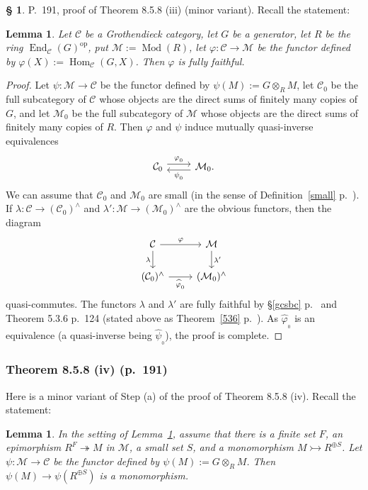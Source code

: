 \documentclass[12pt]{article}
\newtheorem{lem}[thm]{Lemma}
\theoremstyle{remark}
\theoremstyle{definition}
\newtheorem{s}[thm]{\S}
\newcommand{\C}{\mathcal C}
\newcommand{\M}{\mathcal M}
\newcommand{\pp}{\varphi}
\newcommand{\epi}{\twoheadrightarrow}
\DeclareMathOperator{\Hom}{Hom}
\DeclareMathOperator{\Mod}{Mod}
\DeclareMathOperator{\op}{op}
\begin{document}
\begin{s} P.~191, proof of Theorem 8.5.8 (iii) (minor variant). Recall the statement: 

\begin{lem}\label{858iii}
Let $\C$ be a Grothendieck category, let $G$ be a generator, let $R$ be the ring $\operatorname{End}_\C(G)^{\op}$, put $\M:=\Mod(R)$, let $\pp:\C\to\M$ be the functor defined by $\pp(X):=\Hom_\C(G,X)$. Then $\pp$ is fully faithful. 
\end{lem}

\begin{proof}
Let $\psi:\M\to\C$ be the functor defined by $\psi(M):=G\otimes_RM$, let $\C_0$ be the full subcategory of $\C$ whose objects are the direct sums of finitely many copies of $G$, and let $\M_0$ be the full subcategory of $\M$ whose objects are the direct sums of finitely many copies of $R$. Then $\pp$ and $\psi$ induce mutually quasi-inverse equivalences 
$$
\begin{tikzcd}
\C_0\ar[yshift=.7ex]{r}{\pp_{{}_0}}&\M_0.\ar[yshift=-.7ex]{l}{\psi_{{}_0}}
\end{tikzcd}
$$ 
We can assume that $\C_0$ and $\M_0$ are small (in the sense of Definition~\ref{small} p.~\pageref{small}). If $\lambda:\C\to(\C_0)^\wedge$ and $\lambda':\M\to(\M_0)^\wedge$ are the obvious functors, then the diagram 
$$
\begin{tikzcd}
\C\ar{r}{\pp}\ar{d}[swap]{\lambda}&\M\ar{d}{\lambda'}\\
(\C_0)^\wedge\ar{r}[swap]{\widehat\pp_{{}_0}}&(\M_0)^\wedge
\end{tikzcd}
$$ 
quasi-commutes. The functors $\lambda$ and $\lambda'$ are fully faithful by \S\ref{gcsbc} p.~\pageref{gcsbc} and Theorem 5.3.6 p.~124 (stated above as Theorem~\ref{536} p.~\pageref{536}). As $\widehat\pp_{{}_0}$ is an equivalence (a quasi-inverse being $\widehat\psi_{{}_0}$), the proof is complete.
\end{proof}
\end{s}


\subsubsection{Theorem 8.5.8 (iv) (p.~191)} 

Here is a minor variant of Step (a) of the proof of Theorem 8.5.8 (iv). Recall the statement: 

\begin{lem}
In the setting of Lemma~\ref{858iii}, assume that there is a finite set $F$, an epimorphism $R^F\epi M$ in $\M$, a small set $S$, and a monomorphism $M\rightarrowtail R^{\oplus S}$. Let $\psi:\M\to\C$ be the functor defined by $\psi(M):=G\otimes_RM$. Then $\psi(M)\to\psi(R^{\oplus S})$ is a monomorphism. 
\end{lem}
\end{document}
